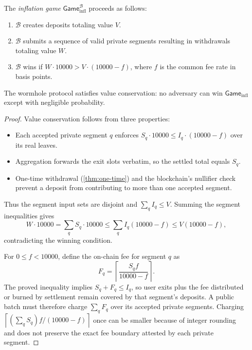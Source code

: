 \documentclass{iacrcc}
\begin{document}
\begin{definition}
The \emph{inflation game} \(\mathsf{Game}_{\mathrm{infl}}^{\mathcal{B}}\) proceeds as follows:
\begin{enumerate}
    \item \(\mathcal{B}\) creates deposits totaling value \(V\).
    \item \(\mathcal{B}\) submits a sequence of valid private segments resulting in withdrawals totaling value \(W\).
    \item \(\mathcal{B}\) wins if \(W\cdot 10000 > V\cdot(10000-f)\), where \(f\) is the common fee rate in basis points.
\end{enumerate}
\end{definition}

\begin{theorem}
The wormhole protocol satisfies value conservation: no adversary can win \(\mathsf{Game}_{\mathrm{infl}}\) except with negligible probability.
\end{theorem}

\begin{proof}
Value conservation follows from three properties:
\begin{itemize}
    \item Each accepted private segment \(q\) enforces \(S_q\cdot10000 \leq I_q\cdot(10000-f)\) over its real leaves.
    \item Aggregation forwards the exit slots verbatim, so the settled total equals \(S_q\).
    \item One-time withdrawal (\cref{thm:one-time}) and the blockchain's nullifier check prevent a deposit from contributing to more than one accepted segment.
\end{itemize}
Thus the segment input sets are disjoint and \(\sum_q I_q\leq V\). Summing the segment inequalities gives
\[
W\cdot10000
= \sum_q S_q\cdot10000
\leq \sum_q I_q(10000-f)
\leq V(10000-f),
\]
contradicting the winning condition.

For \(0\leq f<10000\), define the on-chain fee for segment \(q\) as
\[
F_q=\left\lceil\frac{S_q f}{10000-f}\right\rceil.
\]
The proved inequality implies \(S_q+F_q\leq I_q\), so user exits plus the fee distributed or burned by settlement remain covered by that segment's deposits. A public batch must therefore charge \(\sum_q F_q\) over its accepted private segments. Charging \(\left\lceil(\sum_q S_q)f/(10000-f)\right\rceil\) once can be smaller because of integer rounding and does not preserve the exact fee boundary attested by each private segment.
\end{proof}
\end{document}
